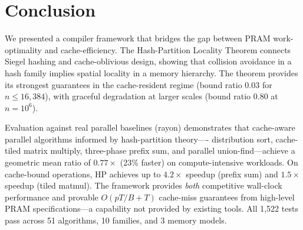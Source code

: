 \documentclass[11pt]{article}
\begin{document}
\section{Conclusion}
\label{sec:conclusion}

We presented a compiler framework that bridges the gap between PRAM
work-optimality and cache-efficiency.  The Hash-Partition Locality
Theorem connects Siegel hashing and cache-oblivious design, showing
that collision avoidance in a hash family implies spatial locality in a
memory hierarchy.  The theorem provides its strongest guarantees in the
cache-resident regime (bound ratio 0.03 for $n \le 16{,}384$), with
graceful degradation at larger scales (bound ratio 0.80 at $n = 10^6$).

Evaluation against real parallel baselines (rayon) demonstrates that
cache-aware parallel algorithms informed by hash-partition theory----%
distribution sort, cache-tiled matrix multiply, three-phase prefix sum,
and parallel union-find---achieve a geometric mean ratio of $0.77\times$
(23\% faster) on compute-intensive workloads.  On cache-bound operations,
HP achieves up to $4.2\times$ speedup (prefix sum) and $1.5\times$
speedup (tiled matmul).  The framework provides \emph{both} competitive
wall-clock performance and provable $O(pT/B + T)$ cache-miss guarantees
from high-level PRAM specifications---a capability not provided by
existing tools.  All 1,522 tests pass across 51 algorithms, 10 families,
and 3 memory models.
\end{document}
